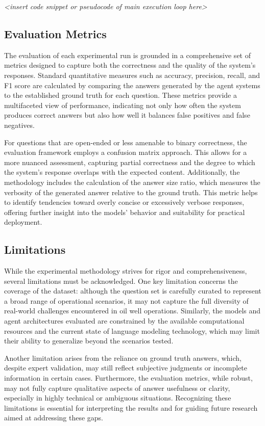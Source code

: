             \textit{<insert code snippet or pseudocode of main execution loop here>}

        \subsection{Evaluation Metrics}

            The evaluation of each experimental run is grounded in a comprehensive set of metrics designed to capture both the correctness and the quality of the system’s responses. Standard quantitative measures such as accuracy, precision, recall, and F1 score are calculated by comparing the answers generated by the agent systems to the established ground truth for each question. These metrics provide a multifaceted view of performance, indicating not only how often the system produces correct answers but also how well it balances false positives and false negatives.

            For questions that are open-ended or less amenable to binary correctness, the evaluation framework employs a confusion matrix approach. This allows for a more nuanced assessment, capturing partial correctness and the degree to which the system’s response overlaps with the expected content. Additionally, the methodology includes the calculation of the answer size ratio, which measures the verbosity of the generated answer relative to the ground truth. This metric helps to identify tendencies toward overly concise or excessively verbose responses, offering further insight into the models’ behavior and suitability for practical deployment.

        \subsection{Limitations}

            While the experimental methodology strives for rigor and comprehensiveness, several limitations must be acknowledged. One key limitation concerns the coverage of the dataset: although the question set is carefully curated to represent a broad range of operational scenarios, it may not capture the full diversity of real-world challenges encountered in oil well operations. Similarly, the models and agent architectures evaluated are constrained by the available computational resources and the current state of language modeling technology, which may limit their ability to generalize beyond the scenarios tested.

            Another limitation arises from the reliance on ground truth answers, which, despite expert validation, may still reflect subjective judgments or incomplete information in certain cases. Furthermore, the evaluation metrics, while robust, may not fully capture qualitative aspects of answer usefulness or clarity, especially in highly technical or ambiguous situations. Recognizing these limitations is essential for interpreting the results and for guiding future research aimed at addressing these gaps.

